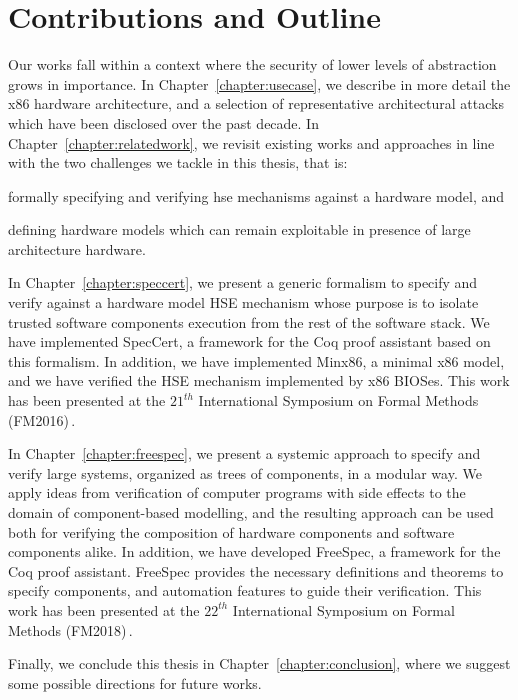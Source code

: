 \section{Contributions and Outline}

Our works fall within a context where the security of lower levels of
abstraction grows in importance.
%
In Chapter~\ref{chapter:usecase}, we describe in more detail the x86 hardware
architecture, and a selection of representative architectural attacks which have
been disclosed over the past decade.
%
In Chapter~\ref{chapter:relatedwork}, we revisit existing works and approaches
in line with the two challenges we tackle in this thesis, that is:
%
\begin{inparaenum}[(1)]
\item formally specifying and verifying \ac{hse} mechanisms against a hardware
  model, and
%
\item defining hardware models which can remain exploitable in presence of large
  architecture hardware.
\end{inparaenum}

In Chapter~\ref{chapter:speccert}, we present a generic formalism to specify and
verify against a hardware model HSE mechanism whose purpose is to isolate
trusted software components execution from the rest of the software stack.
%
We have implemented SpecCert, a framework for the Coq proof assistant based on
this formalism. In addition, we have implemented {\sc Minx86}, a minimal x86
model, and we have verified the HSE mechanism implemented by x86 BIOSes.
%
This work has been presented at the $21^{th}$ International Symposium on Formal
Methods (FM2016)\,\cite{letan2016speccert}.

In Chapter~\ref{chapter:freespec}, we present a systemic approach to specify and
verify large systems, organized as trees of components, in a modular way.
%
We apply ideas from verification of computer programs with side effects to the
domain of component-based modelling, and the resulting approach can be used both
for verifying the composition of hardware components and software components
alike.
%
In addition, we have developed FreeSpec, a framework for the Coq proof
assistant.
%
FreeSpec provides the necessary definitions and theorems to specify components,
and automation features to guide their verification.
%
This work has been presented at the $22^{th}$ International Symposium on Formal
Methods (FM2018)\,\cite{letan2018freespec}.

Finally, we conclude this thesis in Chapter~\ref{chapter:conclusion}, where we
suggest some possible directions for future works.
